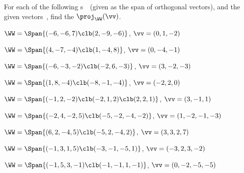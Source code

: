\begin{exercise}  
For each of the following s~\WW\ (given as the span of orthogonal vectors), and the given vectors~\vv, find the  \(\proj_\WW(\vv)\). 

\begin{Parts}
\item \(\WW=\Span\{(-6,-6,7)\clb(2,-9,-6)\}\), \(\vv=(0,1,-2)\)

\begin{OmitV1}
\item \(\WW=\Span\{(4,-7,-4)\clb(1,-4,8)\}\), \(\vv=(0,-4,-1)\)

\item \(\WW=\Span\{(-6,-3,-2)\clb(-2,6,-3)\}\), \(\vv=(3,-2,-3)\)
\end{OmitV1}

\item \(\WW=\Span\{(1,8,-4)\clb(-8,-1,-4)\}\), \(\vv=(-2,2,0)\)

\item \(\WW=\Span\{(-1,2,-2)\clb(-2,1,2)\clb(2,2,1)\}\), \(\vv=(3,-1,1)\)
\answer{\(\proj_\WW(\vv)=\vv\)}

\begin{OmitV1}
\item \(\WW=\Span\{(-2,4,-2,5)\clb(-5,-2,-4,-2)\}\), \(\vv=(1,-2,-1,-3)\)

\item \(\WW=\Span\{(6,2,-4,5)\clb(-5,2,-4,2)\}\), \(\vv=(3,3,2,7)\)
\end{OmitV1}

\item \(\WW=\Span\{(-1,3,1,5)\clb(-3,-1,-5,1)\}\), \(\vv=(-3,2,3,-2)\)

\item \(\WW=\Span\{(-1,5,3,-1)\clb(-1,-1,1,-1)\}\), \(\vv=(0,-2,-5,-5)\)


\end{Parts}
\end{exercise}
